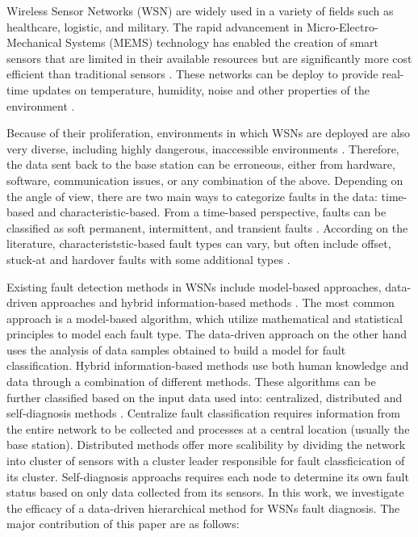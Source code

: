 Wireless Sensor Networks (WSN) are widely used in a variety of fields such as healthcare, logistic, and military. The rapid advancement in
Micro-Electro-Mechanical Systems (MEMS) technology has enabled the creation of smart sensors that are limited in their available resources but are
significantly more cost efficient than traditional sensors \cite{Yick2008, Chai2020}. These networks can be deploy to provide real-time updates on 
temperature, humidity, noise and other properties of the environment \cite{Yick2008, Chai2020, Ullo2020}.

Because of their proliferation, environments in which WSNs are deployed are also very diverse, including highly dangerous, inaccessible environments
\cite{Prasad2023}. Therefore, the data sent back to the base station can be erroneous, either from hardware, software, communication issues, or 
any combination of the above. Depending on the angle of view, there are two main ways to categorize faults in the data: time-based and
characteristic-based. From a time-based perspective, faults can be classified as soft permanent, intermittent, and transient faults \cite{Prasad2023}.
According on the literature, characteriststic-based fault types can vary, but often include offset, stuck-at and hardover faults with some
additional types \cite{Shi2024, Saeed2021}.

Existing fault detection methods in WSNs include model-based approaches, data-driven approaches and hybrid information-based methods \cite{Shi2024}. The most
common approach is a model-based algorithm, which utilize mathematical and statistical principles to model each fault type. The data-driven approach on
the other hand uses the analysis of data samples obtained to build a model for fault classification. Hybrid information-based methods use both
human knowledge and data through a combination of different methods. These algorithms can be further classified based on the input data used into:
centralized, distributed and self-diagnosis methods \cite{Prasad2023, Takele2024}. Centralize fault classification requires information from the
entire network to be collected and processes at a central location (usually the base station). Distributed methods offer more scalibility by dividing
the network into cluster of sensors with a cluster leader responsible for fault classficication of its cluster. Self-diagnosis approachs requires each
node to determine its own fault status based on only data collected from its sensors. In this work, we investigate the efficacy of a data-driven
hierarchical method for WSNs fault diagnosis. The major contribution of this paper are as follows:

